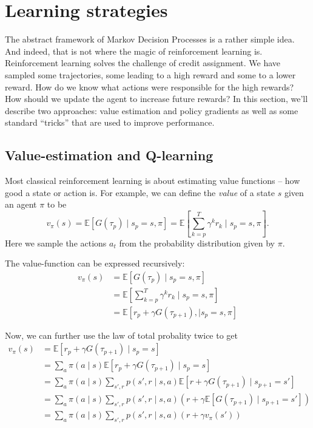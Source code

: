\documentclass{article}
\theoremstyle{changedot}
\theoremstyle{changedotbreak}
\theoremstyle{nonumberplain}
\newcommand{\m}{\mathbb}
\begin{document}
\section{Learning strategies}
The abstract framework of Markov Decision Processes is a rather simple idea. And indeed, that is not where the magic of reinforcement learning is. Reinforcement learning solves the challenge of credit assignment. We have sampled some trajectories, some leading to a high reward and some to a lower reward. How do we know what actions were responsible for the high rewards? How should we update the agent to increase future rewards? In this section, we'll describe two approaches: value estimation and policy gradients as well as some standard ``tricks'' that are used to improve performance.

\subsection{Value-estimation and Q-learning}
Most classical reinforcement learning is about estimating value functions -- how good a state or action is. For example, we can define the \emph{value} of a state $s$ given an agent $\pi$ to be \[v_{\pi}(s) = \mathbb E \left[ G(\tau_{p}) \mid s_{p} = s, \pi \right] = \m E \left[ \sum_{k=p}^{T} \gamma^{k} r_{k} \mid s_{p} = s, \pi \right].\] Here we sample the actions $a_{t}$ from the probability distribution given by $\pi$.

The value-function can be expressed recursively:
\begin{align}
  v_{\pi}(s) &= \m E[G(\tau_{p}) \mid s_{p} = s, \pi] \\
             &= \m E\left[ \sum_{k=p}^{T} \gamma^{k} r_{k} \mid s_{p} = s, \pi \right] \\
  &= \m E \left[ r_{p} + \gamma G(\tau_{p+1}), \mid s_{p} = s, \pi \right]
\end{align}

Now, we can further use the law of total probality twice to get
\begin{align}
  v_{\pi}(s) &= \m E[r_{p} + \gamma G(\tau_{p+1}) \mid s_{p} = s] \\
             &= \sum_{a} \pi(a \mid s) \m E[r_{p} + \gamma G(\tau_{p+1}) \mid s_{p} = s] \\
             &= \sum_{a} \pi(a \mid s) \sum_{s', r} p(s', r \mid s, a) \m E[r + \gamma G(\tau_{p+1}) \mid s_{p+1} = s'] \\
             &= \sum_{a} \pi(a \mid s) \sum_{s', r} p(s', r \mid s, a) ( r + \gamma \m E[G(\tau_{p+1}) \mid s_{p+1} = s'] )\\
             &= \sum_{a} \pi(a \mid s) \sum_{s', r} p(s', r \mid s, a) (r + \gamma v_{\pi}(s'))
\end{align}
\end{document}

